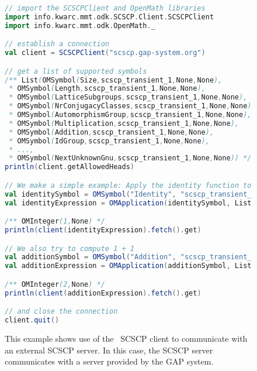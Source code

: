 \begin{figure}[h]
  \begin{center}
    \begin{lstlisting}[language=scala]
// import the SCSCPClient and OpenMath libraries
import info.kwarc.mmt.odk.SCSCP.Client.SCSCPClient
import info.kwarc.mmt.odk.OpenMath._

// establish a connection
val client = SCSCPClient("scscp.gap-system.org")

// get a list of supported symbols
/** List(OMSymbol(Size,scscp_transient_1,None,None),
 * OMSymbol(Length,scscp_transient_1,None,None),
 * OMSymbol(LatticeSubgroups,scscp_transient_1,None,None),
 * OMSymbol(NrConjugacyClasses,scscp_transient_1,None,None),
 * OMSymbol(AutomorphismGroup,scscp_transient_1,None,None),
 * OMSymbol(Multiplication,scscp_transient_1,None,None),
 * OMSymbol(Addition,scscp_transient_1,None,None),
 * OMSymbol(IdGroup,scscp_transient_1,None,None),
 * ...,
 * OMSymbol(NextUnknownGnu,scscp_transient_1,None,None)) */
println(client.getAllowedHeads)

// We make a simple example: Apply the identity function to an integer 1
val identitySymbol = OMSymbol("Identity", "scscp_transient_1", None, None)
val identityExpression = OMApplication(identitySymbol, List(OMInteger(1, None)), None, None)

/** OMInteger(1,None) */
println(client(identityExpression).fetch().get)

// We also try to compute 1 + 1
val additionSymbol = OMSymbol("Addition", "scscp_transient_1", None, None)
val additionExpression = OMApplication(additionSymbol, List(OMInteger(1, None), OMInteger(1, None)), None, None)

/** OMInteger(2,None) */
println(client(additionExpression).fetch().get)

// and close the connection
client.quit()
\end{lstlisting}
  \end{center}
  
  \vspace*{-1.5em}
  

  \caption[SCSCP Client Example]{
    This example shows use of the \mmt\ SCSCP client to communicate with an external SCSCP server. 
    In this case, the SCSCP server communicates with a server provided by the GAP system.  
  }
  \label{fig:scscpclient}
\end{figure}